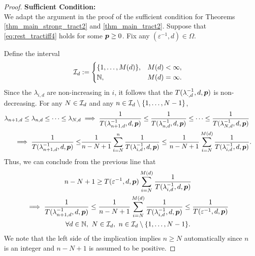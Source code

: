 \documentclass[11pt,a4paper]{article}
\renewcommand{\hI}{\ci}
\begin{document}
\begin{proof}
    \textbf{Sufficient Condition:}\\
We adapt the argument in the proof of the sufficient condition for Theorems \ref{thm_main_strong_tract2} and \ref{thm_main_tract2}.  Suppose that \eqref{eq:rest_tractiff4} holds for some $\boldsymbol{p} \ge 0$. Fix any $(\varepsilon^{-1},d) \in \Omega$. 

Define the interval
\begin{equation} \label{eq:hIdef}
\hI_{d}:=\begin{cases} 
\{1,\ldots, M(d)\}, & M(d) < \infty, \\
\naturals, & M(d) = \infty.
\end{cases}
\end{equation}
Since the $\lambda_{i,d}$ are non-increasing in $i$, it follows that the $T(\lambda_{\cdot,d}^{-1},d,\boldsymbol{p})$ is non-decreasing. For any $N\in \hI_d$ and any $n \in \hI_d \setminus \{1, \ldots, N-1\}$,
\begin{align*}
    \lambda_{n+1,d} \le \lambda_{n,d} \le \cdots \le \lambda_{N,d}
    & \implies \frac{1}{T(\lambda_{n+1, d}^{-1},d,\boldsymbol{p})} \le \frac{1}{T(\lambda_{n, d}^{-1},d,\boldsymbol{p})} \le \cdots \le \frac{1}{T(\lambda_{N, d}^{-1},d,\boldsymbol{p})} \\
     \implies \frac{1}{T(\lambda_{n+1, d}^{-1},d,\boldsymbol{p}) }
    \le &\frac{1}{n-N+1} \sum_{i=N}^n  \frac{1}{T(\lambda_{i, d}^{-1},d,\boldsymbol{p}) }
    \le \frac{1}{n-N+1} \sum_{i=N}^{M(d)}  \frac{1}{T(\lambda_{i, d}^{-1},d,\boldsymbol{p})}.
\end{align*}
Thus, we can conclude from the previous line that
\begin{multline} \label{eq:implicate_a_rest}
    n - N +1 \ge T(\varepsilon^{-1},d,\vp) \sum_{i=N}^{M(d)} \frac{1}{T(\lambda_{i, d}^{-1},d,\vp)} \\
   \implies   \frac{1}{T(\lambda_{n+1, d}^{-1},d,\vp)} \le
   \frac{1}{n-N+1} \sum_{i=N}^{M(d)} \frac{1}{T(\lambda_{i, d}^{-1},d,\vp) } \le \frac{1}{T(\varepsilon^{-1},d,\vp)} \\ \forall d \in \naturals, \ N \in \hI_d, \ n \in \hI_d \setminus \{1, \ldots, N-1\}.
\end{multline}
We note that the left side of the implication implies $n \ge N$ automatically since $n$ is an integer and $n - N +1$ is assumed to be positive.


\end{proof}
\end{document}
